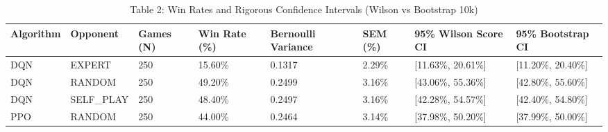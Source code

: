\begin{table}
\caption{Table 2: Win Rates and Rigorous Confidence Intervals (Wilson vs Bootstrap 10k)}
\label{tab:table2_win_rate_and_confidence_intervals}
\begin{tabular}{llllllll}
\toprule
Algorithm & Opponent & Games (N) & Win Rate (\%) & Bernoulli Variance & SEM (\%) & 95\% Wilson Score CI & 95\% Bootstrap CI \\
\midrule
DQN & EXPERT & 250 & 15.60\% & 0.1317 & 2.29\% & [11.63\%, 20.61\%] & [11.20\%, 20.40\%] \\
DQN & RANDOM & 250 & 49.20\% & 0.2499 & 3.16\% & [43.06\%, 55.36\%] & [42.80\%, 55.60\%] \\
DQN & SELF\_PLAY & 250 & 48.40\% & 0.2497 & 3.16\% & [42.28\%, 54.57\%] & [42.40\%, 54.80\%] \\
PPO & RANDOM & 250 & 44.00\% & 0.2464 & 3.14\% & [37.98\%, 50.20\%] & [37.99\%, 50.00\%] \\
\bottomrule
\end{tabular}
\end{table}
